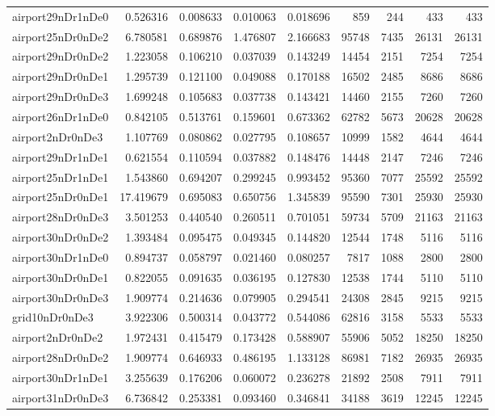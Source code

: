 \begin{longtable}{|l|r|r|r|r|r|r|r|r|}
airport29nDr1nDe0 & 0.526316 & 0.008633 & 0.010063 & 0.018696 & 859 & 244 & 433 & 433 \\
airport25nDr0nDe2 & 6.780581 & 0.689876 & 1.476807 & 2.166683 & 95748 & 7435 & 26131 & 26131 \\
airport29nDr0nDe2 & 1.223058 & 0.106210 & 0.037039 & 0.143249 & 14454 & 2151 & 7254 & 7254 \\
airport29nDr0nDe1 & 1.295739 & 0.121100 & 0.049088 & 0.170188 & 16502 & 2485 & 8686 & 8686 \\
airport29nDr0nDe3 & 1.699248 & 0.105683 & 0.037738 & 0.143421 & 14460 & 2155 & 7260 & 7260 \\
airport26nDr1nDe0 & 0.842105 & 0.513761 & 0.159601 & 0.673362 & 62782 & 5673 & 20628 & 20628 \\
airport2nDr0nDe3 & 1.107769 & 0.080862 & 0.027795 & 0.108657 & 10999 & 1582 & 4644 & 4644 \\
airport29nDr1nDe1 & 0.621554 & 0.110594 & 0.037882 & 0.148476 & 14448 & 2147 & 7246 & 7246 \\
airport25nDr1nDe1 & 1.543860 & 0.694207 & 0.299245 & 0.993452 & 95360 & 7077 & 25592 & 25592 \\
airport25nDr0nDe1 & 17.419679 & 0.695083 & 0.650756 & 1.345839 & 95590 & 7301 & 25930 & 25930 \\
airport28nDr0nDe3 & 3.501253 & 0.440540 & 0.260511 & 0.701051 & 59734 & 5709 & 21163 & 21163 \\
airport30nDr0nDe2 & 1.393484 & 0.095475 & 0.049345 & 0.144820 & 12544 & 1748 & 5116 & 5116 \\
airport30nDr1nDe0 & 0.894737 & 0.058797 & 0.021460 & 0.080257 & 7817 & 1088 & 2800 & 2800 \\
airport30nDr0nDe1 & 0.822055 & 0.091635 & 0.036195 & 0.127830 & 12538 & 1744 & 5110 & 5110 \\
airport30nDr0nDe3 & 1.909774 & 0.214636 & 0.079905 & 0.294541 & 24308 & 2845 & 9215 & 9215 \\
grid10nDr0nDe3 & 3.922306 & 0.500314 & 0.043772 & 0.544086 & 62816 & 3158 & 5533 & 5533 \\
airport2nDr0nDe2 & 1.972431 & 0.415479 & 0.173428 & 0.588907 & 55906 & 5052 & 18250 & 18250 \\
airport28nDr0nDe2 & 1.909774 & 0.646933 & 0.486195 & 1.133128 & 86981 & 7182 & 26935 & 26935 \\
airport30nDr1nDe1 & 3.255639 & 0.176206 & 0.060072 & 0.236278 & 21892 & 2508 & 7911 & 7911 \\
airport31nDr0nDe3 & 6.736842 & 0.253381 & 0.093460 & 0.346841 & 34188 & 3619 & 12245 & 12245 \\

\end{longtable}
